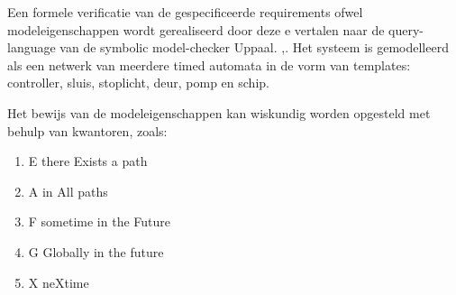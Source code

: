 \documentclass{article}
\begin{document}
	Een formele verificatie van de gespecificeerde requirements ofwel modeleigenschappen wordt gerealiseerd door deze e vertalen naar de query-language van de symbolic model-checker Uppaal.  \cite{alurSystemClok},\cite{alurModelHybrid}.
	Het systeem is gemodelleerd als een netwerk van meerdere timed automata in de vorm van templates: controller, sluis, stoplicht, deur, pomp en schip.
	
	Het bewijs van de modeleigenschappen kan wiskundig worden opgesteld met behulp van kwantoren, zoals:
	\begin{enumerate}
		\item E there Exists a path
		\item A in All paths
		\item F sometime in the Future
		\item G Globally in the future
		\item X neXtime
	\end{enumerate}
	
	
	
	
	
	
	
	
\end{document}
